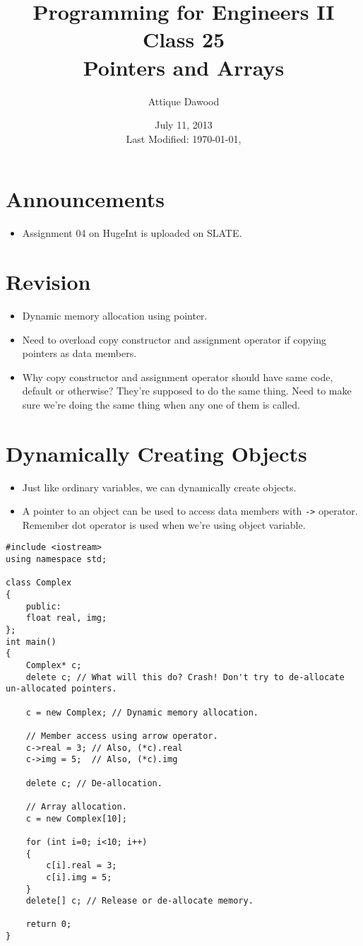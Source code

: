 \documentclass[12pt,a4paper]{article}
\title{\vspace{-2cm}Programming for Engineers II\\Class 25\\Pointers and Arrays}
\author{Attique Dawood}
\date{July 11, 2013\\[0.2cm] Last Modified: \today, \currenttime}
\begin{document}
\maketitle
\section{Announcements}
\begin{itemize}
\item Assignment 04 on HugeInt is uploaded on SLATE.
\end{itemize}
\section{Revision}
\begin{itemize}
\item Dynamic memory allocation using pointer.
\item Need to overload copy constructor and assignment operator if copying pointers as data members.
\item Why copy constructor and assignment operator should have same code, default or otherwise? They're supposed to do the same thing. Need to make sure we're doing the same thing when any one of them is called.
\end{itemize}
\section{Dynamically Creating Objects}
\begin{itemize}
\item Just like ordinary variables, we can dynamically create objects.
\item A pointer to an object can be used to access data members with \verb|->| operator. Remember dot operator is used when we're using object variable.
\end{itemize}
\begin{lstlisting}[caption={Pointers to Objects}]
#include <iostream>
using namespace std;

class Complex
{
	public:
	float real, img;
};
int main()
{
	Complex* c;
	delete c; // What will this do? Crash! Don't try to de-allocate un-allocated pointers.

	c = new Complex; // Dynamic memory allocation.

	// Member access using arrow operator.
	c->real = 3; // Also, (*c).real
	c->img = 5;  // Also, (*c).img

	delete c; // De-allocation.

	// Array allocation.
	c = new Complex[10];

	for (int i=0; i<10; i++)
	{
		c[i].real = 3;
		c[i].img = 5;
	}
	delete[] c; // Release or de-allocate memory.

	return 0;
}
\end{lstlisting}
\end{document}
